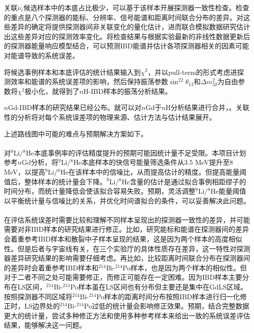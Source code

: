 \documentclass[a4paper,zihao=-4]{article}
\begin{document}
关联$\overline{\nu}_e$候选样本中的本底占比极少，可以基于该样本开展探测器一致性检查。检查的重点是八个探测器的能标、分辨率、信号能谱和距离时间联合分布的差异。对这些差异的确定将提供探测器间非关联变化的量化估计，进而联合模拟数据研究估计出这些差异对应的探测效率变化。将检查结果与根据实验最新的非线性数据更新后的探测器能量响应模型结合，可以预测IBD能谱并估计各项探测器相关的因素可能对能谱导致的系统误差。

将候选事例样本和本底评估的统计结果输入到$\chi^2$，并以pull-term的形式考虑进探测效率和能谱的系统误差项的影响，然后保持振荡参数$\sin^22\theta_{13}$和$\Delta m_{32}^2$为自由参数将$\chi^2$极小化，就得到了$n$H-IBD样本的振荡分析结果。

$n$Gd-IBD样本的研究结果已经公布。就可以对$n$Gd于$n$H分析结果进行合并，。关联性的分析将对每个系统误差项的物理来源、估计方法与估计结果展开。

上述路线图中可能的难点与预期解决方案如下。
\paragraph{}对$^9$Li/$^8$He本底事例率的评估精度提升的预期可能因统计量不足受限。本项目计划参考$n$Gd分析，将$^9$Li/$^8$He本底样本的快信号能量筛选条件从3.5 MeV提升至8 MeV，以提高$^9$Li/$^8$He在该样本中的信噪比，从而提高估计的精度。但提高能量阈值后，整体样本的统计量会下降。$^9$Li/$^8$He含量的估计是通过拟合事例相距缪子的时间分布，而统计量降低会使该拟合容易失败。预期，灵活调整$^9$Li/$^8$He能量阈值以平衡统计量与信噪比的关系，并优化时间谱拟合的条件，可以妥善解决此问题。
\paragraph{}在评估系统误差时需要比较和理解不同样本呈现出的探测器一致性的差异，并可能需要对非IBD样本的研究结果进行修正。比如，研究能标和能谱在探测器间的差异会着重参考IBD样本和散裂中子样本呈现的结果，这是因为两个样本的高度相似性。但是后者与宇宙线有关，在三个实验厅的具体性质存在差异，这一特性对探测器差异研究结果的影响需要仔细考虑。再比如，比较距离时间联合分布在探测器间的差异时会着重参考IBD样本和$^{214}$Bi-$^{214}$Po样本，也是因为两个样本的相似性。但对于二者不同之处可能需要修正，而修正可能存在一定困难。因为IBD样本主要分布在LS区间，$^{214}$Bi-$^{214}$Po样本虽在LS区间也有分布但主要还是集中在GdLS区域。按照探测器不同区域将$^{214}$Bi-$^{214}$Po样本的距离时间分布按照IBD样本进行归一化修正时，LS边界处的$^{214}$Bi-$^{214}$Po过低的统计量会影响修正效果。预期，结合完整数据更大的统计量，尝试多种修正方法和使用多种参考样本来给出一致的系统误差评估结果，能够解决这一问题。
\end{document}
